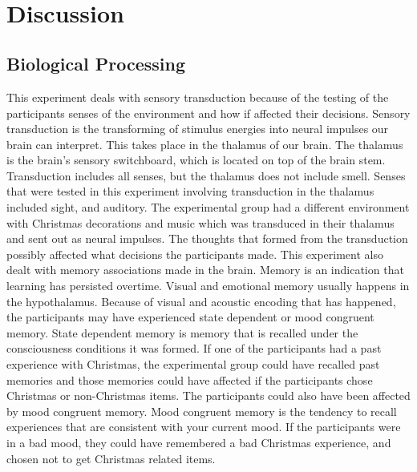 \documentclass[twoside]{article}
\begin{document}
\begin{multicols}{2}
\\ \\ \\ \\ \\ \\ \\ \\ \\ 







\section{Discussion}

\subsection{Biological Processing}
This experiment deals with sensory transduction because of the testing of the participants senses of the environment and how if affected their decisions. Sensory transduction is the transforming of stimulus energies into neural impulses our brain can interpret. This takes place in the thalamus of our brain. The thalamus is the brain's sensory switchboard, which is located on top of the brain stem. Transduction includes all senses, but the thalamus does not include smell. Senses that were tested in this experiment involving transduction in the thalamus included sight, and auditory. The experimental group had a different environment with Christmas decorations and music which was transduced in their thalamus and sent out as neural impulses. The thoughts that formed from the transduction possibly affected what decisions the participants made. This experiment also dealt with memory associations made in the brain. Memory is an indication that learning has persisted overtime. Visual and emotional memory usually happens in the hypothalamus. Because of visual and acoustic encoding that has happened, the participants may have experienced state dependent or mood congruent memory. State dependent memory is memory that is recalled under the consciousness conditions it was formed. If one of the participants had a past experience with Christmas, the experimental group could have recalled past memories and those memories could have affected if the participants chose Christmas or non-Christmas items. The participants could also have been affected by mood congruent memory. Mood congruent memory is the tendency to recall experiences that are consistent with your current mood. If the participants were in a bad mood, they could have remembered a bad Christmas experience, and chosen not to get Christmas related items. 



\end{multicols}
\end{document}

